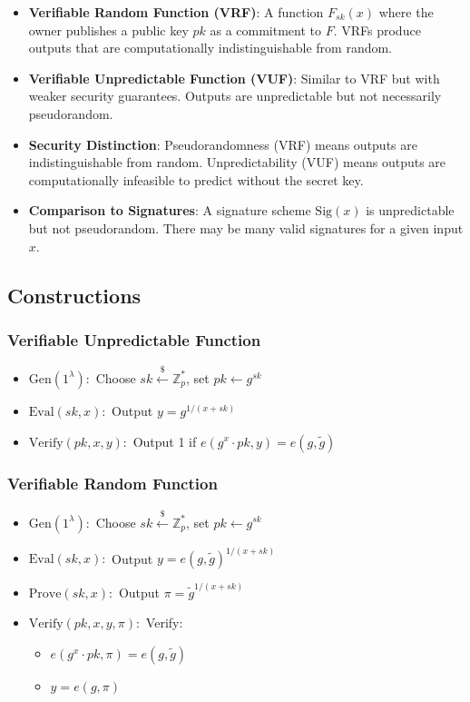 \begin{itemize}
    \item \textbf{Verifiable Random Function (VRF)}: A function $F_{sk}(x)$ where the owner publishes a public key $pk$ as a commitment to $F$. VRFs produce outputs that are computationally indistinguishable from random.
    
    \item \textbf{Verifiable Unpredictable Function (VUF)}: Similar to VRF but with weaker security guarantees. Outputs are unpredictable but not necessarily pseudorandom.
    
    \item \textbf{Security Distinction}: Pseudorandomness (VRF) means outputs are indistinguishable from random. Unpredictability (VUF) means outputs are computationally infeasible to predict without the secret key.
    
    \item \textbf{Comparison to Signatures}: A signature scheme $\text{Sig}(x)$ is unpredictable but not pseudorandom. There may be many valid signatures for a given input $x$.
\end{itemize}

\subsection{Constructions}

\subsubsection{Verifiable Unpredictable Function}
\begin{itemize}
    \item $\text{Gen}(1^\lambda):$ Choose $sk \stackrel{\$}{\leftarrow} \mathbb{Z}_p^*$, set $pk \leftarrow g^{sk}$
    \item $\text{Eval}(sk, x):$ Output $y = g^{1/(x + sk)}$
    \item $\text{Verify}(pk, x, y):$ Output 1 if $e(g^x \cdot pk, y) = e(g, \tilde{g})$
\end{itemize}

\subsubsection{Verifiable Random Function}
\begin{itemize}
    \item $\text{Gen}(1^\lambda):$ Choose $sk \stackrel{\$}{\leftarrow} \mathbb{Z}_p^*$, set $pk \leftarrow g^{sk}$
    \item $\text{Eval}(sk, x):$ Output $y = e(g, \tilde{g})^{1/(x + sk)}$
    \item $\text{Prove}(sk, x):$ Output $\pi = \tilde{g}^{1/(x + sk)}$
    \item $\text{Verify}(pk, x, y, \pi):$ Verify:
    \begin{itemize}
        \item $e(g^x \cdot pk, \pi) = e(g, \tilde{g})$ 
        \item $y = e(g, \pi)$
    \end{itemize}
\end{itemize}

